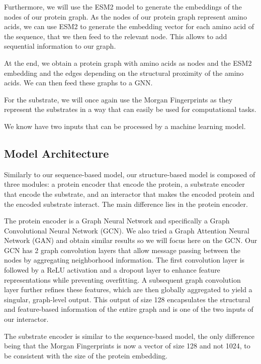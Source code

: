 Furthermore, we will use the ESM2 model to generate the embeddings of the nodes of our protein graph. As the nodes
of our protein graph represent amino acids, we can use ESM2 to generate the embedding vector for each amino acid
of the sequence, that we then feed to the relevant node. This allows to add sequential information to our graph.

At the end, we obtain a protein graph with amino acids as nodes and the ESM2 embedding and the edges depending on
the structural proximity of the amino acids. We can then feed these graphs to a GNN.

For the substrate, we will once again use the Morgan Fingerprints as they represent the substrates in a way 
that can easily be used for computational tasks.

We know have two inputs that can be processed by a machine learning model.

\subsection{Model Architecture}

Similarly to our sequence-based model, our structure-based model is composed of three modules: a protein encoder 
that encode the protein, a substrate encoder that encode the substrate, and an interactor that makes the 
encoded protein and the encoded substrate interact. The main difference lies in the protein encoder.

The protein encoder is a Graph Neural Network and specifically a Graph Convolutional Neural Network (GCN). We also 
tried a Graph Attention Neural Network (GAN) and obtain similar results so we will focus here on the GCN. Our GCN
has 2 graph convolution layers that allow message passing between the nodes by aggregating neighborhood 
information. The first convolution layer is followed by a ReLU activation and a dropout layer to enhance 
feature representations while preventing overfitting. A subsequent graph convolution layer further refines 
these features, which are then globally aggregated to yield a singular, graph-level output. This output of size 128
encapsulates the structural and feature-based information of the entire graph and is one of the two inputs of 
our interactor. 

The substrate encoder is similar to the sequence-based model, the only difference being that the Morgan Fingerprints
is now a vector of size 128 and not 1024, to be consistent with the size of the protein embedding.


